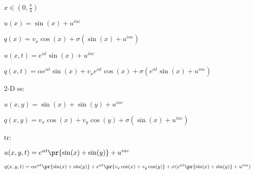 $x\in(0,\frac{\pi}{4})$

$u(x) = \sin(x) + u^{inc}$

$q(x) = v_x\cos(x) + \sigma(\sin(x) + u^{inc})$

$u(x,t) = e^{\alpha t}\sin(x) + u^{inc}$

$q(x,t) = \alpha e^{\alpha t}\sin(x) + v_x e^{\alpha t}\cos(x)
   + \sigma(e^{\alpha t}\sin(x) + u^{inc})$

2-D ss:

$u(x,y) = \sin(x) + \sin(y) + u^{inc}$

$q(x,y) = v_x\cos(x) + v_y\cos(y) + \sigma(\sin(x) + u^{inc})$

tr:

$u(x,y,t) = e^{\alpha t}\pr{\sin(x) + \sin(y)} + u^{inc}$

$q(x,y,t) = \alpha e^{\alpha t}\pr{\sin(x) + \sin(y)}
   + e^{\alpha t}\pr{v_x \cos(x) + v_y \cos(y)}
   + \sigma(e^{\alpha t}\pr{\sin(x) + \sin(y)} + u^{inc})$
